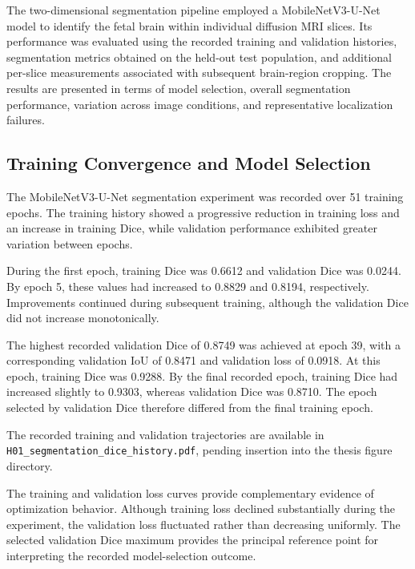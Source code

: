 The two-dimensional segmentation pipeline employed a MobileNetV3-U-Net model to identify the fetal brain within individual diffusion MRI slices. Its performance was evaluated using the recorded training and validation histories, segmentation metrics obtained on the held-out test population, and additional per-slice measurements associated with subsequent brain-region cropping. The results are presented in terms of model selection, overall segmentation performance, variation across image conditions, and representative localization failures.

\subsection{Training Convergence and Model Selection}
\label{subsec:results_2d_segmentation_training}

The MobileNetV3-U-Net segmentation experiment was recorded over 51 training epochs. The training history showed a progressive reduction in training loss and an increase in training Dice, while validation performance exhibited greater variation between epochs.

During the first epoch, training Dice was 0.6612 and validation Dice was 0.0244. By epoch 5, these values had increased to 0.8829 and 0.8194, respectively. Improvements continued during subsequent training, although the validation Dice did not increase monotonically.

The highest recorded validation Dice of 0.8749 was achieved at epoch 39, with a corresponding validation IoU of 0.8471 and validation loss of 0.0918. At this epoch, training Dice was 0.9288. By the final recorded epoch, training Dice had increased slightly to 0.9303, whereas validation Dice was 0.8710. The epoch selected by validation Dice therefore differed from the final training epoch.

The recorded training and validation trajectories are available in \texttt{H01\_segmentation\_dice\_history.pdf}, pending insertion into the thesis figure directory.

The training and validation loss curves provide complementary evidence of optimization behavior. Although training loss declined substantially during the experiment, the validation loss fluctuated rather than decreasing uniformly. The selected validation Dice maximum provides the principal reference point for interpreting the recorded model-selection outcome.

